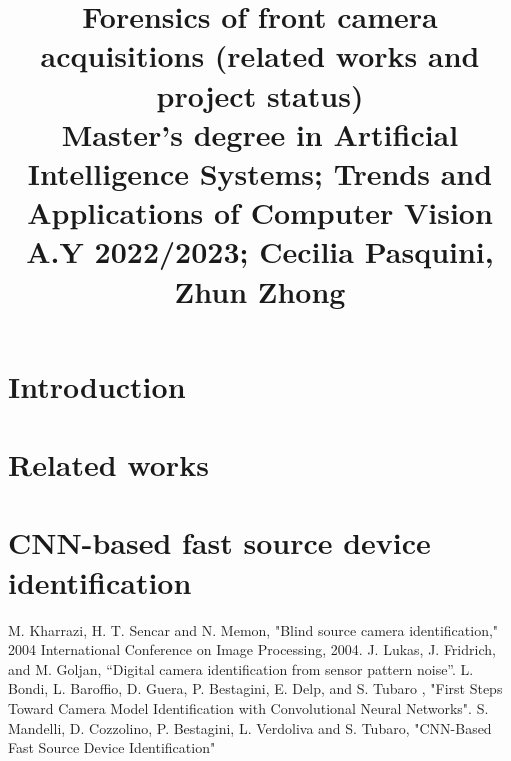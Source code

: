 \documentclass[conference]{IEEEtran}
\begin{document}
\title{Forensics of front camera acquisitions (related works and project status)\\
{\footnotesize Master's degree in Artificial Intelligence Systems;
Trends and Applications of Computer Vision A.Y 2022/2023;
Cecilia Pasquini, Zhun Zhong}
}

\author{

\and
{}

\and
{}

\and
{}
}

\maketitle

\section{Introduction}



\section{Related works}



\section{CNN-based fast source device identification}



\begin{thebibliography}{00}
 M. Kharrazi, H. T. Sencar and N. Memon, "Blind source camera identification," 2004 International Conference on Image Processing, 2004.
 J. Lukas, J. Fridrich, and M. Goljan, “Digital camera identification from sensor pattern noise”.
 L. Bondi, L. Baroffio, D. Guera, P. Bestagini, E. Delp, and S. Tubaro , "First Steps Toward Camera Model Identification with Convolutional Neural Networks".
 S. Mandelli, D. Cozzolino, P. Bestagini, L. Verdoliva and S. Tubaro, "CNN-Based Fast Source Device Identification"
\end{thebibliography}
\vspace{12pt}
\end{document}
